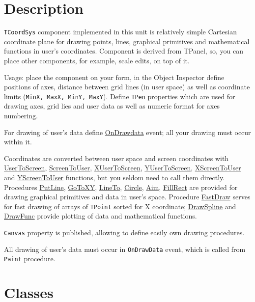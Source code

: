 \documentclass[12pt,a4paper,oneside]{report}
\newcommand{\code}[1]{\texttt{#1}}
\begin{document}
\section{Description}
\code{TCoordSys} component implemented in this unit is relatively simple Cartesian coordinate plane for drawing points, lines, graphical primitives and mathematical functions in user's coordinates. Component is derived from TPanel, so, you can place other components, for example, scale edits, on top of it.

Usage: place the component on your form, in the Object Inspector define positions of axes, distance between grid lines (in user space) as well as coordinate limits (\code{MinX, MaxX, MinY, MaxY}). Define \code{TPen} properties which are used for drawing axes, grid lies and user data as well as numeric format for axes numbering.

For drawing of user's data define \hyperref[lmcoordsys.TCoordSys-OnDrawData]{OnDrawdata} event; all your drawing must occur within it. 

Coordinates are converted between user space and screen coordinates with \hyperref[lmcoordsys.TCoordSys-UserToScreen]{UserToScreen}, \hyperref[lmcoordsys.TCoordSys-ScreenToUser]{ScreenToUser}, \hyperref[lmcoordsys.TCoordSys-XUserToScreen]{XUserToScreen}, \hyperref[lmcoordsys.TCoordSys-YScreenToUser]{YUserToScreen}, \hyperref[lmcoordsys.TCoordSys-XScreenToUser]{XScreenToUser} and \hyperref[lmcoordsys.TCoordSys-YScreenToUser]{YScreenToUser} functions, but you seldom need to call them directly. Procedures \hyperref[lmcoordsys.TCoordSys-PutLine]{PutLine}, \hyperref[lmcoordsys.TCoordSys-GoToXY]{GoToXY}, \hyperref[lmcoordsys.TCoordSys-LineTo]{LineTo}, \hyperref[lmcoordsys.TCoordSys-Circle]{Circle}, \hyperref[lmcoordsys.TCoordSys-Aim]{Aim}, \hyperref[lmcoordsys.TCoordSys-FillRect]{FillRect} are provided for drawing graphical primitives and data in user's space. Procedure \hyperref[lmcoordsys.TCoordSys-FastDraw]{FastDraw} serves for fast drawing of arrays of \code{TPoint} sorted for X coordinate; \hyperref[lmcoordsys.TCoordSys-DrawSpline]{DrawSpline} and \hyperref[lmcoordsys.TCoordSys-DrawFunc]{DrawFunc} provide plotting of data and mathematical functions.

\code{Canvas} property is published, allowing to define easily own drawing procedures.

All drawing of user's data must occur in \code{OnDrawData} event, which is called from \code{Paint} procedure.  
\section{Classes}
\end{document}
